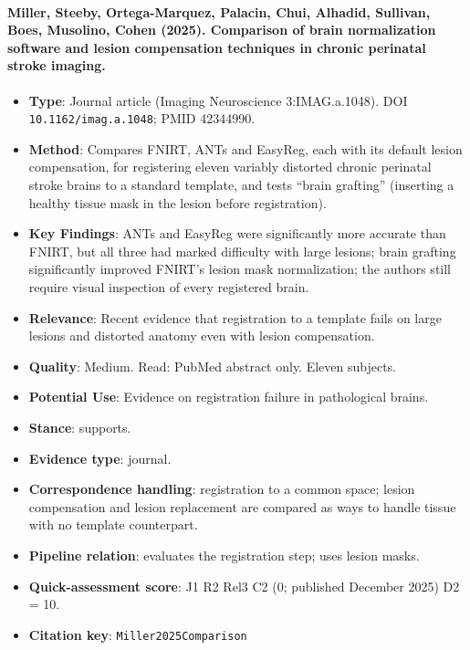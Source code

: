 \documentclass[journal,onecolumn]{IEEEtran}
\begin{document}
\paragraph{Miller, Steeby, Ortega-Marquez, Palacin, Chui, Alhadid, Sullivan, Boes, Musolino, Cohen (2025). Comparison of brain normalization software and lesion compensation techniques in chronic perinatal stroke imaging.~\cite{Miller2025Comparison}}\mbox{}

\begin{itemize}

\item{} \textbf{Type}: Journal article (Imaging Neuroscience 3:IMAG.a.1048). DOI \nolinkurl{10.1162/imag.a.1048}; PMID 42344990.

\item{} \textbf{Method}: Compares FNIRT, ANTs and EasyReg, each with its default lesion compensation, for registering eleven variably distorted chronic perinatal stroke brains to a standard template, and tests ``brain grafting'' (inserting a healthy tissue mask in the lesion before registration).

\item{} \textbf{Key Findings}: ANTs and EasyReg were significantly more accurate than FNIRT, but all three had marked difficulty with large lesions; brain grafting significantly improved FNIRT's lesion mask normalization; the authors still require visual inspection of every registered brain.

\item{} \textbf{Relevance}: Recent evidence that registration to a template fails on large lesions and distorted anatomy even with lesion compensation.

\item{} \textbf{Quality}: Medium. Read: PubMed abstract only. Eleven subjects.

\item{} \textbf{Potential Use}: Evidence on registration failure in pathological brains.

\item{} \textbf{Stance}: supports.

\item{} \textbf{Evidence type}: journal.

\item{} \textbf{Correspondence handling}: registration to a common space; lesion compensation and lesion replacement are compared as ways to handle tissue with no template counterpart.

\item{} \textbf{Pipeline relation}: evaluates the registration step; uses lesion masks.

\item{} \textbf{Quick-assessment score}: J1 R2 Rel3 C2 (0; published December 2025) D2 = 10.

\item{} \textbf{Citation key}: \texttt{Miller2025Comparison}

\end{itemize}
\end{document}

